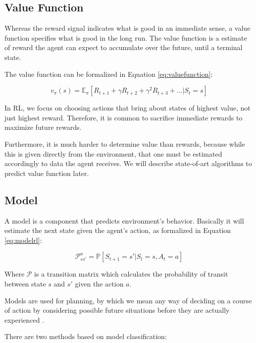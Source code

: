 \subsection{Value Function}\label{sec:valuefunction}
Whereas the reward signal indicates what is good in an immediate sense, a value function specifies what is good in the long run. The value function is a estimate of reward the agent can expect to accumulate over the future, until a terminal state. 

The value function can be formalized in Equation \ref{eq:valuefunction}:

\begin{equation}\label{eq:valuefunction}
v_{\pi}(s) = \mathbb{E}_{\pi}[R_{t+1} + \gamma R_{t+2} + \gamma^{2} R_{t + 3} + ... | S_{t} = s]
\end{equation}

In RL, we focus on choosing actions that bring about states of highest value, not just highest reward. Therefore, it is common to sacrifice immediate rewards to maximize future rewards.

Furthermore, it is much harder to determine value than rewards, because while this is given directly from the environment, that one must be estimated accordingly to data the agent receives. We will describe state-of-art algorithms to predict value function later.

\subsection{Model}

A model is a component that predicts environment's behavior. Basically it will estimate the next state given the agent's action, as formalized in Equation \ref{eq:modelrl}:

\begin{equation}\label{eq:modelrl}
\mathcal{P}_{ss'}^{a} = \mathbb{P}[S_{t+1} = s' | S_{t} = s, A_{t} = a]
\end{equation}

Where $\mathcal{P}$ is a transition matrix which calculates the probability of transit between state $s$ and $s'$ given the action $a$.

Models are used for planning, by which we
mean any way of deciding on a course of action by considering possible future situations before they are
actually experienced \cite{sutton1998rli}.

There are two methods based on model classification:

